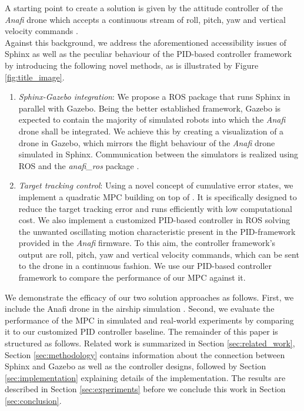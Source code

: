 A starting point to create a solution is given by the attitude controller of the \textit{Anafi} drone which accepts a continuous stream of roll, pitch, yaw and vertical velocity commands \cite{olympe_pcmd}. \\
Against this background, we address the aforementioned accessibility issues of Sphinx as well as the peculiar behaviour of the PID-based controller framework by introducing the following novel methods, as is illustrated by Figure \ref{fig:title_image}.
\begin{enumerate}
\item \textit{Sphinx-Gazebo integration}: We propose a ROS package that runs Sphinx in parallel with Gazebo. Being the better established framework, Gazebo is expected to contain the majority of simulated robots into which the \textit{Anafi} drone shall be integrated. We achieve this by creating a visualization of a  drone in Gazebo, which mirrors the flight behaviour of the \textit{Anafi} drone simulated in Sphinx. Communication between the simulators is realized using ROS and the \textit{anafi_ros} package \cite{sarabakha2023}. 
\item \textit{Target tracking control}: Using a novel concept of cumulative error states, we implement a quadratic MPC building on top of  \cite{tallamraju2018}. It is specifically  designed to reduce the target tracking error and runs efficiently with low computational cost. We also implement a customized PID-based controller in ROS solving the unwanted oscillating motion characteristic present in the  PID-framework provided in the \textit{Anafi} firmware. To this aim, the controller framework's output are roll, pitch, yaw and vertical velocity commands, which can be sent to the drone in a continuous fashion. We use our PID-based controller framework to compare the performance of our MPC against it.
\end{enumerate}
We demonstrate the efficacy of our two solution approaches as follows. First, we include the Anafi drone in the airship simulation \cite{price2022}. Second, we evaluate the performance of the MPC in simulated and real-world experiments by comparing it to our customized PID controller baseline.
The remainder of this paper is structured as follows. Related work is summarized in Section \ref{sec:related_work}, Section \ref{sec:methodology} contains information about the connection between Sphinx and Gazebo as well as the controller designs, followed by Section \ref{sec:implementation} explaining details of the implementation. The results are described in Section \ref{sec:experiments} before we conclude this work in Section \ref{sec:conclusion}.



